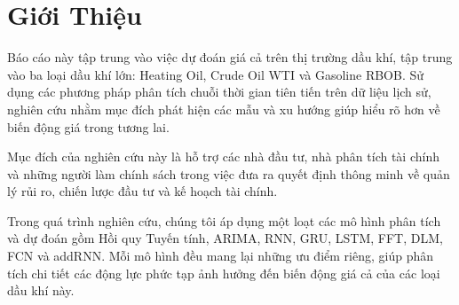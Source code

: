 \documentclass[conference]{IEEEtran}
\begin{document}
\section{Giới Thiệu}
Báo cáo này tập trung vào việc dự đoán giá cả trên thị trường dầu khí, tập trung vào ba loại dầu khí lớn: Heating Oil, Crude Oil WTI và Gasoline RBOB. Sử dụng các phương pháp phân tích chuỗi thời gian tiên tiến trên dữ liệu lịch sử, nghiên cứu nhằm mục đích phát hiện các mẫu và xu hướng giúp hiểu rõ hơn về biến động giá trong tương lai.

Mục đích của nghiên cứu này là hỗ trợ các nhà đầu tư, nhà phân tích tài chính và những người làm chính sách trong việc đưa ra quyết định thông minh về quản lý rủi ro, chiến lược đầu tư và kế hoạch tài chính.

Trong quá trình nghiên cứu, chúng tôi áp dụng một loạt các mô hình phân tích và dự đoán gồm Hồi quy Tuyến tính, ARIMA, RNN, GRU, LSTM, FFT, DLM, FCN và addRNN. Mỗi mô hình đều mang lại những ưu điểm riêng, giúp phân tích chi tiết các động lực phức tạp ảnh hưởng đến biến động giá cả của các loại dầu khí này.
\end{document}
